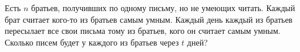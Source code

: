 Есть $n$ братьев, получивших по одному письму, но не умеющих читать.
Каждый брат считает кого-то из братьев самым умным.
Каждый день каждый из братьев пересылает все свои письма тому из братьев,
кого он считает самым умным.
Сколько писем будет у каждого из братьев через $t$ дней?
